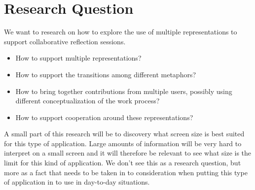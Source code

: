 \section{Research Question}
We want to research on how to explore the use of multiple representations to support collaborative reflection sessions.

\begin{itemize}
	\item How to support multiple representations?
	\item How to support the transitions among different metaphors?
	\item How to bring together contributions from multiple users, possibly using different conceptualization of the work process?
	\item How to support cooperation around these representations?
\end{itemize}

A small part of this research will be to discovery what screen size is best suited for this type of application. Large amounts of information will be very hard to interpret on a small screen and it will therefore be relevant to see what size is the limit for this kind of application. We don’t see this as a research question, but more as a fact that needs to be taken in to consideration when putting this type of application in to use in day-to-day situations.